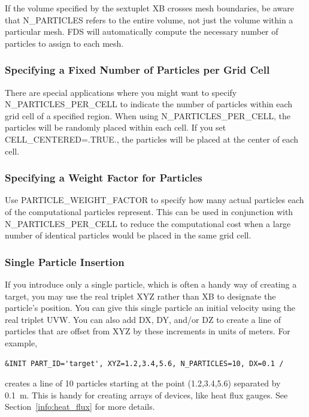 \documentclass[11pt]{book}
\begin{document}
If the volume specified by the sextuplet {\ct XB} crosses mesh boundaries, be aware that {\ct N\_PARTICLES} refers to the entire volume, not just the volume within a particular mesh. FDS will automatically compute the necessary number of particles to assign to each mesh.

\subsubsection{Specifying a Fixed Number of Particles per Grid Cell}

There are special applications where you might want to specify {\ct N\_PARTICLES\_PER\_CELL} to indicate the number of particles within each grid cell of a specified region. When using {\ct N\_PARTICLES\_PER\_CELL}, the particles will be randomly placed within each cell.  If you set {\ct CELL\_CENTERED=.TRUE.}, the particles will be placed at the center of each cell.

\subsubsection{Specifying a Weight Factor for Particles}

Use {\ct PARTICLE\_WEIGHT\_FACTOR} to specify how many actual particles each of the computational particles represent. This can be used in conjunction with {\ct N\_PARTICLES\_PER\_CELL} to reduce the computational cost when a large number of identical particles would be placed in the same grid cell.


\subsubsection{Single Particle Insertion}

If you introduce only a single particle, which is often a handy way of creating a target, you may use the real triplet {\ct XYZ} rather than {\ct XB} to designate the particle's position.  You can give this single particle an initial velocity using the real triplet {\ct UVW}. You can also add {\ct DX}, {\ct DY}, and/or {\ct DZ} to create a line of particles that are offset from {\ct XYZ} by these increments in units of meters. For example,
\begin{lstlisting}
&INIT PART_ID='target', XYZ=1.2,3.4,5.6, N_PARTICLES=10, DX=0.1 /
\end{lstlisting}
creates a line of 10 particles starting at the point (1.2,3.4,5.6) separated by 0.1~m. This is handy for creating arrays of devices, like heat flux gauges. See Section~\ref{info:heat_flux} for more details.
\end{document}
